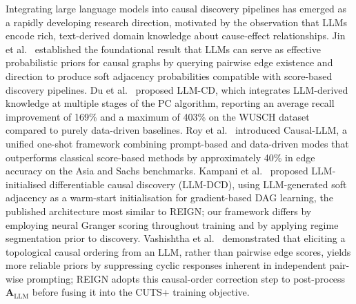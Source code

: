 Integrating large language models into causal discovery pipelines has
emerged as a rapidly developing research direction, motivated by the
observation that LLMs encode rich, text-derived domain knowledge about
cause-effect relationships.
Jin et al.~\cite{Jin2024ICLR} established the foundational result
that LLMs can serve as effective probabilistic priors for causal graphs
by querying pairwise edge existence and direction to produce soft
adjacency probabilities compatible with score-based discovery pipelines.
Du et al.~\cite{Du2025} proposed LLM-CD, which integrates LLM-derived
knowledge at multiple stages of the PC algorithm, reporting an average
recall improvement of 169\% and a maximum of 403\% on the WUSCH dataset
compared to purely data-driven baselines.
Roy et al.~\cite{Roy2025} introduced Causal-LLM, a unified one-shot
framework combining prompt-based and data-driven modes that outperforms
classical score-based methods by approximately 40\% in edge accuracy
on the Asia and Sachs benchmarks.
Kampani et al.~\cite{Waxman2024} proposed LLM-initialised differentiable
causal discovery (LLM-DCD), using LLM-generated soft adjacency as a
warm-start initialisation for gradient-based DAG learning, the published
architecture most similar to REIGN; our framework differs by employing
neural Granger scoring throughout training and by applying regime
segmentation prior to discovery.
Vashishtha et al.~\cite{Vashishtha2025} demonstrated that eliciting a
topological causal ordering from an LLM, rather than pairwise edge scores,
yields more reliable priors by suppressing cyclic responses inherent in
independent pair-wise prompting; REIGN adopts this causal-order correction
step to post-process $\mathbf{A}_{\mathrm{LLM}}$ before fusing it into
the CUTS+ training objective.

